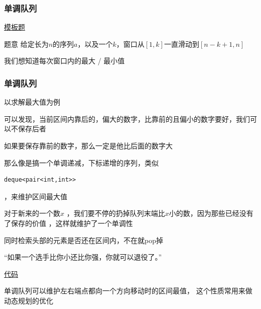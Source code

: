 \documentclass{beamer}
\begin{document}
  \begin{frame}
    \frametitle{单调队列}

    \href{https://www.luogu.com.cn/problem/P1886}{模板题}

    \begin{block}{题意}
      给定长为$n$的序列$a$，以及一个$k$，窗口从$[1,k]$一直滑动到$[n-k+1,n]$

      我们想知道每次窗口内的最大 / 最小值
    \end{block}
  \end{frame}

  \begin{frame}[fragile]
    \frametitle{单调队列}
    以求解最大值为例

    可以发现，当前区间内靠后的，偏大的数字，比靠前的且偏小的数字要好，我们可以不保存后者

    \pause

    \vspace*{1\baselineskip}

    如果要保存靠前的数字，那么一定是他比后面的数字大

    \pause

    那么像是搞一个单调递减，下标递增的序列，类似
    \begin{lstlisting}
deque<pair<int,int>>
    \end{lstlisting}
    ，来维护区间最大值

    \pause

    对于新来的一个数$x$
    ，我们要不停的扔掉队列末端比$x$小的数，因为那些已经没有了保存的价值
    ，这样就维护了一个单调性

    \vspace*{1\baselineskip}

    同时检索头部的元素是否还在区间内，不在就pop掉
  \end{frame}

  \begin{frame}
    “如果一个选手比你小还比你强，你就可以退役了。”
    
    \vspace*{1\baselineskip}
    
    \href{http://syh521.cn/file/monotone-queue.cpp}{代码}
    
    \vspace*{1\baselineskip}

    单调队列可以维护左右端点都向一个方向移动时的区间最值，
    这个性质常用来做动态规划的优化
  \end{frame}
\end{document}
